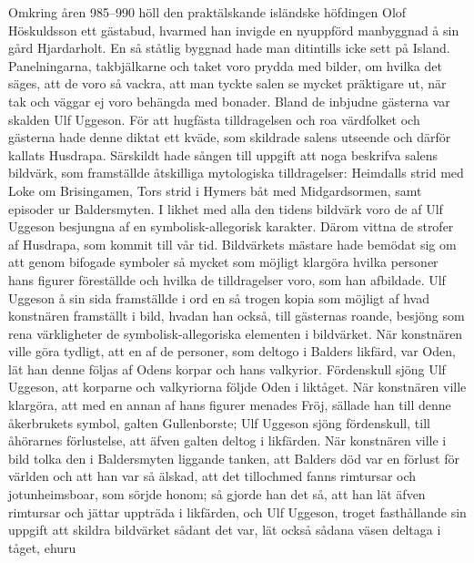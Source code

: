 Omkring åren 985--990 höll den praktälskande isländske höfdingen Olof
Höskuldsson ett gästabud, hvarmed han invigde en nyuppförd
\protect\hypertarget{lb1625905.xhtmlux5cux23start206}{}{}\protect\hypertarget{lb1625905.xhtmlux5cux23start206-a}{}{}\protect\hypertarget{lb1625905.xhtmlux5cux23start206-b}{}{}\protect\hypertarget{lb1625905.xhtmlux5cux23start206-c}{}{}\protect\hypertarget{lb1625905.xhtmlux5cux23start206-d}{}{}
manbyggnad å sin gård Hjardarholt. En så ståtlig byggnad hade man
ditintills icke sett på Island. Panelningarna, takbjälkarne och taket
voro prydda med bilder, om hvilka det säges, att de voro så vackra, att
man tyckte salen se mycket präktigare ut, när tak och väggar ej voro
behängda med bonader. Bland de inbjudne gästerna var skalden Ulf
Uggeson. För att hugfästa tilldragelsen och roa värdfolket och gästerna
hade denne diktat ett kväde, som skildrade salens utseende och därför
kallats Husdrapa. Särskildt hade sången till uppgift att noga beskrifva
salens bildvärk, som framställde åtskilliga mytologiska tilldragelser:
Heimdalls strid med Loke om Brisingamen, Tors strid i Hymers båt med
Midgardsormen, samt episoder ur Baldersmyten. I likhet med alla den
tidens bildvärk voro de af Ulf Uggeson besjungna af en
symbolisk-allegorisk karakter. Därom vittna de strofer af Husdrapa, som
kommit till vår tid. Bildvärkets mästare hade bemödat sig om att genom
bifogade symboler så mycket som möjligt klargöra hvilka personer hans
figurer föreställde och hvilka de tilldragelser voro, som han afbildade.
Ulf Uggeson å sin sida framställde i ord en så trogen kopia som möjligt
af hvad konstnären framställt i bild, hvadan han också, till gästernas
roande, besjöng som rena värkligheter de symbolisk-allegoriska elementen
i bildvärket. När konstnären ville göra tydligt, att en af de personer,
som deltogo i Balders likfärd, var Oden, lät han denne följas af Odens
korpar och hans valkyrior. Fördenskull sjöng Ulf Uggeson, att korparne
och valkyriorna följde Oden i liktåget. När konstnären ville klargöra,
att med en annan af hans figurer menades Fröj, sällade han till denne
åkerbrukets symbol, galten Gullenborste; Ulf Uggeson sjöng fördenskull,
till åhörarnes förlustelse, att äfven galten deltog i likfärden. När
konstnären ville i bild tolka den i Baldersmyten liggande tanken, att
Balders död var en förlust för världen och att han var så älskad, att
det tillochmed fanns rimtursar och jotunheimsboar, som sörjde honom; så
gjorde han det så, att han lät äfven rimtursar och jättar uppträda i
likfärden, och Ulf Uggeson, troget fasthållande sin uppgift att skildra
bildvärket sådant det var, lät också sådana väsen deltaga i tåget, ehuru
